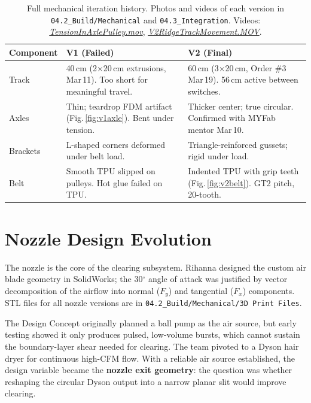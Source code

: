 \documentclass[12pt, letterpaper]{article}
\begin{document}
\vspace{-4pt}
\begin{table}[H]
\centering\small
\caption{Full mechanical iteration history. Photos and videos of each version in \texttt{04.2\_Build/Mechanical} and \texttt{04.3\_Integration}. Videos: \href{https://drive.google.com/drive/folders/1wNK_jYUvHXoMne_cIdYbAIURdvYpuG-J}{\textit{TensionInAxlePulley.mov}}, \href{https://drive.google.com/drive/folders/1wNK_jYUvHXoMne_cIdYbAIURdvYpuG-J}{\textit{V2RidgeTrackMovement.MOV}}.}
\label{tab:mech}
\begin{tabularx}{\textwidth}{@{}l X X@{}}
\toprule
\textbf{Component} & \textbf{V1 (Failed)} & \textbf{V2 (Final)} \\
\midrule
Track  & 40\,cm (2$\times$20\,cm extrusions, Mar\,11). Too short for meaningful travel. & 60\,cm (3$\times$20\,cm, Order \#3 Mar\,19). 56\,cm active between switches. \\
Axles  & Thin; teardrop FDM artifact (Fig.\,\ref{fig:v1axle}). Bent under tension. & Thicker center; true circular. Confirmed with MYFab mentor Mar\,10. \\
Brackets & L-shaped corners deformed under belt load. & Triangle-reinforced gussets; rigid under load. \\
Belt   & Smooth TPU slipped on pulleys. Hot glue failed on TPU. & Indented TPU with grip teeth (Fig.\,\ref{fig:v2belt}). GT2 pitch, 20-tooth. \\
\bottomrule
\end{tabularx}
\end{table}

\section{Nozzle Design Evolution}

The nozzle is the core of the clearing subsystem. Rihanna designed the custom air blade geometry in SolidWorks; the 30$^\circ$ angle of attack was justified by vector decomposition of the airflow into normal ($F_y$) and tangential ($F_x$) components. STL files for all nozzle versions are in \texttt{04.2\_Build/Mechanical/3D Print Files}.

The Design Concept originally planned a ball pump as the air source, but early testing showed it only produces pulsed, low-volume bursts, which cannot sustain the boundary-layer shear needed for clearing. The team pivoted to a Dyson hair dryer for continuous high-CFM flow. With a reliable air source established, the design variable became the \textbf{nozzle exit geometry}: the question was whether reshaping the circular Dyson output into a narrow planar slit would improve clearing.
\end{document}
